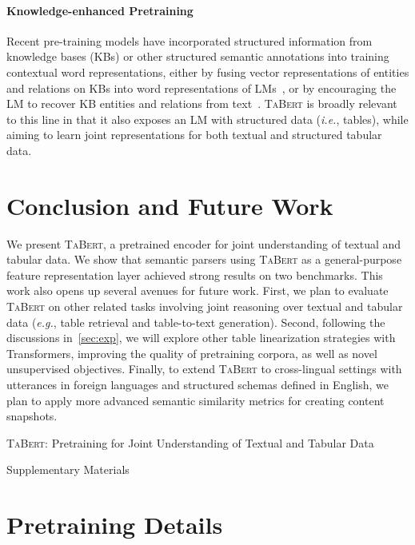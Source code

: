\documentclass[11pt,a4paper]{article}
\def\model/{\textsc{TaBert}}
\newcommand{\eg}{\hbox{\emph{e.g.}}\xspace}
\newcommand{\ie}{\hbox{\emph{i.e.}}\xspace}
\begin{document}
\paragraph{Knowledge-enhanced Pretraining} 
Recent pre-training models have incorporated structured information from knowledge bases (KBs) or other structured semantic annotations 
into training contextual word representations, either by fusing vector representations of entities and relations on KBs into word representations of LMs~\cite{Peters2019KnowledgeEC,Zhang2019ERNIEEL,Zhang2019SemanticsawareBF}, or by encouraging the LM to recover KB entities and relations from text~\cite{Sun2019ERNIEER,Liu2019KBERTEL}.
\model/ is broadly relevant to this line in that it also exposes an LM with structured data (\ie, tables), while aiming to learn joint representations for both textual and structured tabular data.

\section{Conclusion and Future Work}
We present \model/, a pretrained encoder for joint understanding of textual and tabular data.
We show that semantic parsers using \model/ as a general-purpose feature representation layer achieved strong results on two benchmarks.
This work also opens up several avenues for future work.
First, we plan to evaluate \model/ on other related tasks involving joint reasoning over textual and tabular data (\eg, table retrieval and table-to-text generation).
Second, following the discussions in~\autoref{sec:exp}, we will explore other table linearization strategies with Transformers, improving the quality of pretraining corpora, as well as novel unsupervised objectives.
Finally, to extend \model/ to cross-lingual settings with utterances in foreign languages and structured schemas defined in English, we plan to apply more advanced semantic similarity metrics for creating content snapshots.








\newpage
\clearpage
\appendix
\onecolumn
\begin{center}
\Large
\model/: Pretraining for Joint Understanding of Textual and Tabular Data

Supplementary Materials
\end{center}

\section{Pretraining Details}
\end{document}
